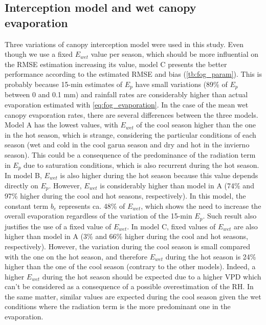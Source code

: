 \documentclass[a4paper,12pt]{article}
\begin{document}
\begin{linenumbers}
\subsection{Interception model and wet canopy evaporation} \label{dis_evaporation}
Three variations of canopy interception model were used in this study. Even though we use a fixed $E_{wet}$ value per season, which should be more influential on the RMSE estimation increasing its value, model C presents the better performance according to the estimated RMSE and bias (\autoref{tb:fog_param}). This is probably because 15-min estimates of $E_p$ have small variations (89\% of $E_p$ between 0 and 0.1 mm) and rainfall rates are considerably higher than actual evaporation estimated with \autoref{eq:fog_evaporation}. In the case of the mean wet canopy evaporation rates, there are several differences between the three models. Model A has the lowest values, with $E_{wet}$ of the cool season higher than the one in the hot season, which is strange, considering the particular conditions of each season (wet and cold in the cool garua season and dry and hot in the invierno season). This could be a consequence of the predominance of the radiation term in $E_p$ due to saturation conditions, which is also recurrent during the hot season. In model B, $E_{wet}$ is also higher during the hot season because this value depends directly on $E_p$. However, $E_{wet}$ is considerably higher than model in A (74\% and 97\% higher during the cool and hot seasons, respectively). In this model, the constant term $b_e$ represents ca. 48\% of $E_{wet}$, which shows the need to increase the overall evaporation regardless of the variation of the 15-min $E_p$. Such result also justifies the use of a fixed value of $E_{wet}$. In model C, fixed values of $E_{wet}$ are also higher than model in A (3\% and 66\% higher during the cool and hot seasons, respectively). However, the variation during the cool season is small compared with the one on the hot season, and therefore $E_{wet}$ during the hot season is 24\% higher than the one of the cool season (contrary to the other models). Indeed, a higher  $E_{wet}$ during the hot season should be expected due to a higher VPD which can't be considered as a consequence of a possible overestimation of the RH. In the same matter, similar values are expected during the cool season given the wet conditions where the radiation term is the more predominant one in the evaporation. 


\end{linenumbers}
\end{document}
